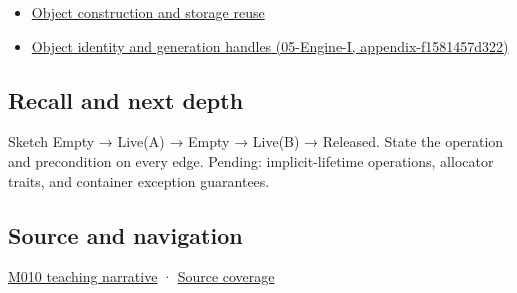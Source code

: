 \begin{itemize}
\tightlist
\item
  \hyperref[appendix-a82f9c438857]{Object construction and storage reuse}
\item
  \href{../05-Engine-I/main.pdf\#nameddest=appendix-f1581457d322}{Object identity and generation handles (05-Engine-I, appendix-f1581457d322)}
\end{itemize}

\subsection{Recall and next depth}\label{appendix-f56c3e43fd4e-recall-and-next-depth}

Sketch Empty → Live(A) → Empty → Live(B) → Released. State the operation and precondition on every edge. Pending: implicit-lifetime operations, allocator traits, and container exception guarantees.

\subsection{Source and navigation}\label{appendix-f56c3e43fd4e-source-and-navigation}

\hyperref[01-foundations-i-ch004-placement-construction-reuses-storage-it-does-not-allocate-it]{M010 teaching narrative} · \hyperref[appendix-fd090d982a15-m010---parts-148-160]{Source coverage}
